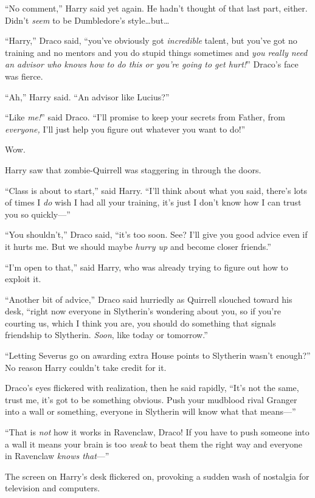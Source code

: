 “No comment,” Harry said yet again. He hadn’t thought of that last part, either. Didn’t \emph{seem} to be Dumbledore’s style…but…

“Harry,” Draco said, “you’ve obviously got \emph{incredible} talent, but you’ve got no training and no mentors and you do stupid things sometimes and \emph{you really need an advisor who knows how to do this or you’re going to get hurt!}” Draco’s face was fierce.

“Ah,” Harry said. “An advisor like Lucius?”

“Like \emph{me!}” said Draco. “I’ll promise to keep your secrets from Father, from \emph{everyone,} I’ll just help you figure out whatever you want to do!”

Wow.

Harry saw that zombie-Quirrell was staggering in through the doors.

“Class is about to start,” said Harry. “I’ll think about what you said, there’s lots of times I \emph{do} wish I had all your training, it’s just I don’t know how I can trust you so quickly—”

“You shouldn’t,” Draco said, “it’s too soon. See? I’ll give you good advice even if it hurts me. But we should maybe \emph{hurry up} and become closer friends.”

“I’m open to that,” said Harry, who was already trying to figure out how to exploit it.

“Another bit of advice,” Draco said hurriedly as Quirrell slouched toward his desk, “right now everyone in Slytherin’s wondering about you, so if you’re courting us, which I think you are, you should do something that signals friendship to Slytherin. \emph{Soon}, like today or tomorrow.”

“Letting Severus go on awarding extra House points to Slytherin wasn’t enough?” No reason Harry couldn’t take credit for it.

Draco’s eyes flickered with realization, then he said rapidly, “It’s not the same, trust me, it’s got to be something obvious. Push your mudblood rival Granger into a wall or something, everyone in Slytherin will know what that means—”

“That is \emph{not} how it works in Ravenclaw, Draco! If you have to push someone into a wall it means your brain is too \emph{weak} to beat them the right way and everyone in Ravenclaw \emph{knows that}—”

The screen on Harry’s desk flickered on, provoking a sudden wash of nostalgia for television and computers.

